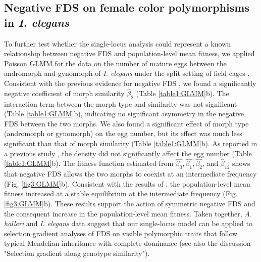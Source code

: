 \documentclass[12pt,]{article}
\begin{document}
\subsection{Negative FDS on female color polymorphisms in \textit{I. elegans}}
To further test whether the single-locus analysis could represent a known relationship between negative FDS and population-level mean fitness, we applied Poisson GLMM for the data on the number of mature eggs between the andromorph and gynomorph of \textit{I. elegans} under the split setting of field cages \citep{takahashi2014evolution}. Consistent with the previous evidence for negative FDS \citep{van2001frequency, le2015evolutionary}, we found a significantly negative coefficient of morph similarity $\hat{\beta}_2$ (Table \ref{table1:GLMM}b). The interaction term between the morph type and similarity was not significant (Table \ref{table1:GLMM}b), indicating no significant asymmetry in the negative FDS between the two morphs. We also found a significant effect of morph type (andromorph or gynomorph) on the egg number, but its effect was much less significant than that of morph similarity (Table \ref{table1:GLMM}b). As reported in a previous study \citep{takahashi2014evolution}, the density did not significantly affect the egg number (Table \ref{table1:GLMM}b). The fitness function estimated from $\hat{\beta_0}, \hat{\beta_1}, \hat{\beta_2}$, and $\hat{\beta}_{12}$ shows that negative FDS allows the two morphs to coexist at an intermediate frequency (Fig. \ref{fig3:GLMM}b). Consistent with the results of \cite{takahashi2014evolution}, the population-level mean fitness increased at a stable equilibrium at the intermediate frequency (Fig. \ref{fig3:GLMM}b). These results support the action of symmetric negative FDS and the consequent increase in the population-level mean fitness. Taken together, \textit{A. halleri} and \textit{I. elegans} data suggest that our single-locus model can be applied to selection gradient analyses of FDS on visible polymorphic traits that follow typical Mendelian inheritance with complete dominance (see also the discussion "Selection gradient along genotype similarity").
\end{document}
